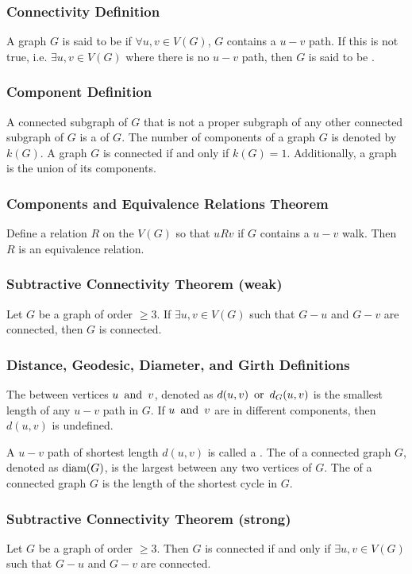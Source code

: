 \subsubsection*{Connectivity Definition}
A graph $G$ is said to be  if $\forall u,v \in V(G)$, $G$ contains a $u-v$ path. If this is not true, i.e. $\exists u,v \in V(G)$ where there is no $u-v$ path, then $G$ is said to be .

\subsubsection*{Component Definition}
A connected subgraph of $G$ that is not a proper subgraph of any other connected subgraph of $G$ is a  of $G$. The number of components of a graph $G$ is denoted by $k(G)$. A graph $G$ is connected if and only if $k(G) = 1$. Additionally, a graph is the union of its components.

\subsubsection*{Components and Equivalence Relations Theorem}
Define a relation $R$ on the $V(G)$ so that $uRv$ if $G$ contains a $u-v$ walk. Then $R$ is an equivalence relation.

\subsubsection*{Subtractive Connectivity Theorem (weak)}
Let $G$ be a graph of order $\geq 3$. If $\exists u,v \in V(G)$ such that $G-u$ and $G-v$ are connected, then $G$ is connected.

\subsubsection*{Distance, Geodesic, Diameter, and Girth Definitions}
The  between vertices $u \operatorname{~\text{and}~} v$, denoted as $d(u,v) \operatorname{~\text{or}~} d_G(u,v)$ is the smallest length of any $u-v$ path in $G$. If $u \operatorname{~\text{and}~} v$ are in different components, then $d(u,v)$ is undefined.

A $u-v$ path of shortest length $d(u,v)$ is called a . The  of a connected graph $G$, denoted as $\operatorname{\text{diam}}(G)$, is the largest  between any two vertices of $G$. The  of a connected graph $G$ is the length of the shortest cycle in $G$.

\subsubsection*{Subtractive Connectivity Theorem (strong)}
Let $G$ be a graph of order $\geq 3$. Then $G$ is connected if and only if $\exists u,v \in V(G)$ such that $G-u$ and $G-v$ are connected.

